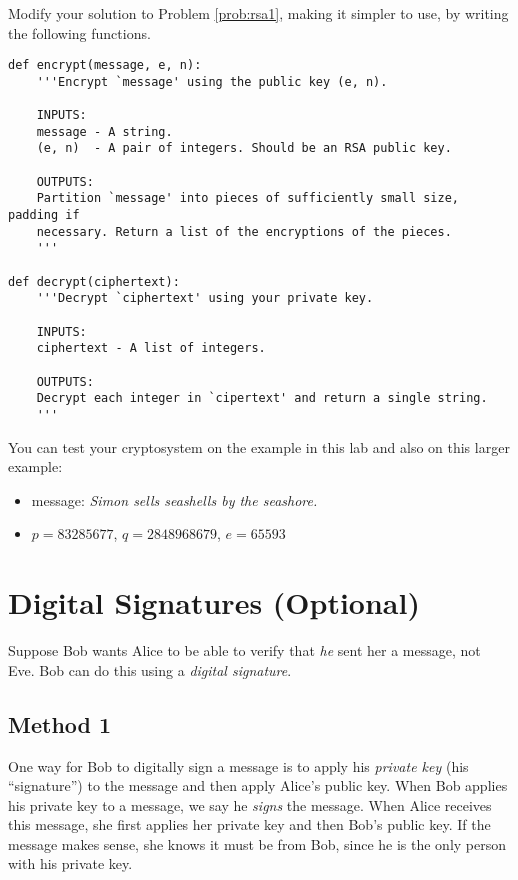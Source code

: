 \begin{problem}[Optional]
Modify your solution to Problem \ref{prob:rsa1}, making it simpler to use, by writing the following functions.
\begin{lstlisting}
def encrypt(message, e, n):
    '''Encrypt `message' using the public key (e, n).
    
    INPUTS:
    message - A string.
    (e, n)  - A pair of integers. Should be an RSA public key.
    
    OUTPUTS:
    Partition `message' into pieces of sufficiently small size, padding if 
    necessary. Return a list of the encryptions of the pieces.
    '''
    
def decrypt(ciphertext):
    '''Decrypt `ciphertext' using your private key.
    
    INPUTS:
    ciphertext - A list of integers.
    
    OUTPUTS:
    Decrypt each integer in `cipertext' and return a single string.
    '''
\end{lstlisting}

You can test your cryptosystem on the example in this lab and also on this larger example:
\begin{itemize}
\item message: \emph{Simon sells seashells by the seashore.}
\item $p=83285677$, $q=2848968679$, $e=65593$
\end{itemize}
\label{rsa2}
\end{problem}

\section*{Digital Signatures (Optional)}
Suppose Bob wants Alice to be able to verify that \emph{he} sent her a message, not Eve.
Bob can do this using a \emph{digital signature}.

\subsection*{Method 1}
One way for Bob to digitally sign a message is to apply his \emph{private key} (his ``signature'') to the message and then apply Alice's public key.
When Bob applies his private key to a message, we say he \emph{signs} the message.
When Alice receives this message, she first applies her private key and then Bob's public key. 
If the message makes sense, she knows it must be from Bob, since he is the only person with his private key.

